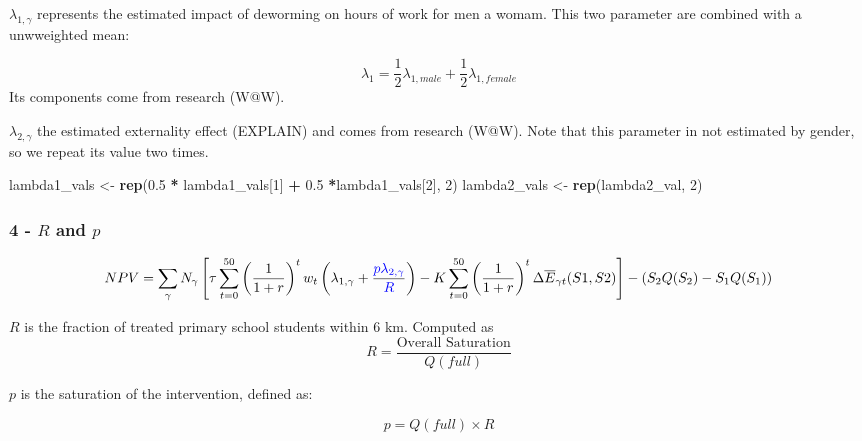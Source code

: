 \documentclass[]{article}
\newenvironment{Shaded}{\begin{snugshade}}{\end{snugshade}}
\newcommand{\DecValTok}[1]{\textcolor[rgb]{0.00,0.00,0.81}{#1}}
\newcommand{\FloatTok}[1]{\textcolor[rgb]{0.00,0.00,0.81}{#1}}
\newcommand{\KeywordTok}[1]{\textcolor[rgb]{0.13,0.29,0.53}{\textbf{#1}}}
\newcommand{\NormalTok}[1]{#1}
\newcommand{\OperatorTok}[1]{\textcolor[rgb]{0.81,0.36,0.00}{\textbf{#1}}}
\newcommand{\StringTok}[1]{\textcolor[rgb]{0.31,0.60,0.02}{#1}}
\begin{document}
\(\lambda_{1,\gamma}\) represents the estimated impact of deworming on
hours of work for men a womam. This two parameter are combined with a
unwweighted mean:

\begin{equation}
\lambda_{1} = \frac{1}{2} \lambda_{1,male} + \frac{1}{2} \lambda_{1,female} 
\end{equation} Its components come from research (W@W).

\(\lambda_{2,\gamma}\) the estimated externality effect (EXPLAIN) and
comes from research (W@W). Note that this parameter in not estimated by
gender, so we repeat its value two times.

\begin{Shaded}
\begin{Highlighting}[]
\NormalTok{lambda1_vals <-}\StringTok{ }\KeywordTok{rep}\NormalTok{(}\FloatTok{0.5} \OperatorTok{*}\StringTok{ }\NormalTok{lambda1_vals[}\DecValTok{1}\NormalTok{] }\OperatorTok{+}\StringTok{ }\FloatTok{0.5} \OperatorTok{*}\NormalTok{lambda1_vals[}\DecValTok{2}\NormalTok{], }\DecValTok{2}\NormalTok{)}
\NormalTok{lambda2_vals <-}\StringTok{ }\KeywordTok{rep}\NormalTok{(lambda2_val, }\DecValTok{2}\NormalTok{)}
\end{Highlighting}
\end{Shaded}

\hypertarget{r-and-p}{%
\subsubsection{\texorpdfstring{4 - \(R\) and
\(p\)}{4 - R and p}}\label{r-and-p}}

\begin{equation}
NPV =  \sum_{\gamma} N_{\gamma} \left[ 
\tau \sum_{t=0}^{50}\left(  \frac{1}{1 + r}\right)^{t} w_{t} 
\left( \lambda_{1, \gamma}  + \frac{\color{blue}{p} \lambda_{2, \gamma}}{\color{blue}{R}} \right) - 
K \sum_{t=0}^{50} \left( \frac{1}{1 + r}\right)^{t} \Delta \overline{E}_{\gamma t}(S1,S2)
\right] - \left( S_{2}Q(S_{2}) - S_{1}Q(S_{1}) \right)
\end{equation}

\(R\) is the fraction of treated primary school students within 6 km.
Computed as \begin{equation}
R = \frac{\text{Overall Saturation}  }{Q(full)}
\end{equation}

\(p\) is the saturation of the intervention, defined as:

\begin{equation}
p = Q(full) \times R
\end{equation}
\end{document}
